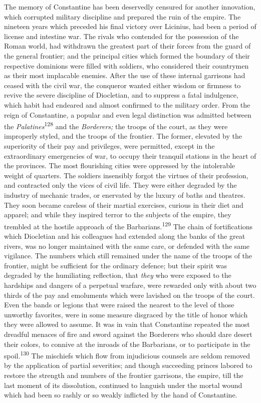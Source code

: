 The memory of Constantine has been deservedly censured for
another innovation, which corrupted military discipline and
prepared the ruin of the empire. The nineteen years which
preceded his final victory over Licinius, had been a period of
license and intestine war. The rivals who contended for the
possession of the Roman world, had withdrawn the greatest part of
their forces from the guard of the general frontier; and the
principal cities which formed the boundary of their respective
dominions were filled with soldiers, who considered their
countrymen as their most implacable enemies. After the use of
these internal garrisons had ceased with the civil war, the
conqueror wanted either wisdom or firmness to revive the severe
discipline of Diocletian, and to suppress a fatal indulgence,
which habit had endeared and almost confirmed to the military
order. From the reign of Constantine, a popular and even legal
distinction was admitted between the \textit{Palatines}\textsuperscript{128} and the
\textit{Borderers;} the troops of the court, as they were improperly
styled, and the troops of the frontier. The former, elevated by
the superiority of their pay and privileges, were permitted,
except in the extraordinary emergencies of war, to occupy their
tranquil stations in the heart of the provinces. The most
flourishing cities were oppressed by the intolerable weight of
quarters. The soldiers insensibly forgot the virtues of their
profession, and contracted only the vices of civil life. They
were either degraded by the industry of mechanic trades, or
enervated by the luxury of baths and theatres. They soon became
careless of their martial exercises, curious in their diet and
apparel; and while they inspired terror to the subjects of the
empire, they trembled at the hostile approach of the Barbarians.\textsuperscript{129}
The chain of fortifications which Diocletian and his
colleagues had extended along the banks of the great rivers, was
no longer maintained with the same care, or defended with the
same vigilance. The numbers which still remained under the name
of the troops of the frontier, might be sufficient for the
ordinary defence; but their spirit was degraded by the
humiliating reflection, that \textit{they} who were exposed to the
hardships and dangers of a perpetual warfare, were rewarded only
with about two thirds of the pay and emoluments which were
lavished on the troops of the court. Even the bands or legions
that were raised the nearest to the level of those unworthy
favorites, were in some measure disgraced by the title of honor
which they were allowed to assume. It was in vain that
Constantine repeated the most dreadful menaces of fire and sword
against the Borderers who should dare desert their colors, to
connive at the inroads of the Barbarians, or to participate in
the spoil.\textsuperscript{130} The mischiefs which flow from injudicious counsels
are seldom removed by the application of partial severities; and
though succeeding princes labored to restore the strength and
numbers of the frontier garrisons, the empire, till the last
moment of its dissolution, continued to languish under the mortal
wound which had been so rashly or so weakly inflicted by the hand
of Constantine.


